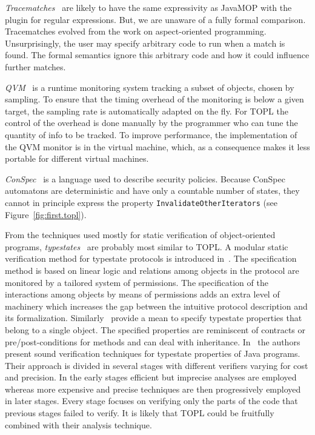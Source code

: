 \documentclass[9pt, preprint]{sigplanconf} %
\theoremstyle{definition}
\theoremstyle{remark}
\begin{document}
{\it Tracematches\/}~\cite{dblp:conf/oopsla/allanachklmsst05} are likely to have the same expressivity as JavaMOP with the plugin for regular expressions.
But, we are unaware of a fully formal comparison.
Tracematches evolved from the work on aspect-oriented programming.
Unsurprisingly, the user may specify arbitrary code to run when a match is found.
The formal semantics ignore this arbitrary code and how it could influence further matches.

{\it QVM\/}~\cite{arnold:2008} is a runtime monitoring system tracking a subset of objects, chosen by
sampling. To ensure that the timing overhead of the monitoring is below a given target, the sampling rate is 
automatically adapted on the fly. For TOPL the control of the overhead is done manually by  the programmer who can tune the quantity of info to be tracked.
To improve performance,  the implementation of the QVM monitor is in the virtual machine, which, as a consequence makes it less portable for
different virtual machines. 

{\it ConSpec\/}~\cite{DBLP:journals/entcs/AktugN08} is a language used to describe security policies.
Because ConSpec automatons are deterministic and have only a countable number of states, they cannot in principle express the property \texttt{InvalidateOtherIterators} (see Figure~\ref{fig:first.topl}).

From the techniques used mostly for static verification of object-oriented programs, {\it typestates\/}~\cite{strom1986} are probably most similar to TOPL\null.
A modular static verification method for typestate protocols is introduced in~\cite{dblp:conf/oopsla/bierhoffa07}.
The specification method is based on linear logic and relations among objects in the protocol are monitored by a tailored system of permissions.
The specification of the interactions among objects by means of permissions adds an extra level of machinery which increases the gap between the intuitive protocol description and its formalization.
Similarly~\cite{deline2004,dblp:conf/sigsoft/BierhoffA05} provide a mean to specify typestate properties that belong to a single object.
The specified properties are reminiscent of contracts or pre/post-conditions for methods and can deal with inheritance.
In~\cite{dblp:conf/issta/FinkYDRG06} the authors present sound verification techniques for typestate properties of Java  programs.
Their approach is divided in several stages with different verifiers varying for cost and precision.
In the early stages efficient but imprecise analyses are employed whereas more expensive and precise techniques are then progressively employed in later stages.
Every stage focuses on verifying only the parts of the code that previous stages failed to verify.
It is likely that  TOPL could be fruitfully combined with their analysis technique.
\end{document}
